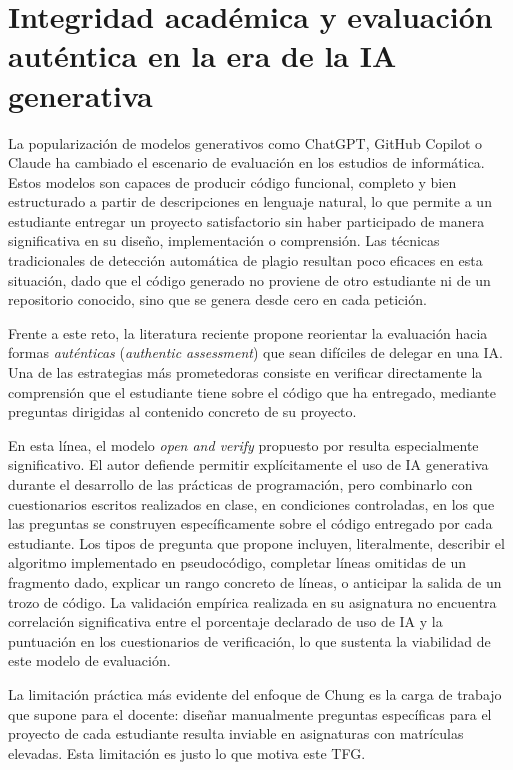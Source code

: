 \section{Integridad académica y evaluación auténtica en la era de la IA generativa}
\label{sec:integridad-academica}

La popularización de modelos generativos como ChatGPT, GitHub Copilot o
Claude ha cambiado el escenario de evaluación en los
estudios de informática. Estos modelos son capaces de producir código
funcional, completo y bien estructurado a partir de descripciones en
lenguaje natural, lo que permite a un estudiante entregar un proyecto
satisfactorio sin haber participado de manera significativa en su
diseño, implementación o comprensión. Las técnicas tradicionales de
detección automática de plagio resultan poco eficaces en esta situación, dado que el código generado no proviene de otro estudiante
ni de un repositorio conocido, sino que se genera desde cero en
cada petición.

Frente a este reto, la literatura reciente propone reorientar la
evaluación hacia formas \emph{auténticas} (\emph{authentic assessment})
que sean difíciles de delegar en una IA. Una de las estrategias más
prometedoras consiste en verificar directamente la comprensión que el
estudiante tiene sobre el código que ha entregado, mediante preguntas
dirigidas al contenido concreto de su proyecto.

En esta línea, el modelo \emph{open and verify} propuesto por
\textcite{chung2026openai} resulta especialmente significativo. El autor
defiende permitir explícitamente el uso de IA generativa durante el
desarrollo de las prácticas de programación, pero combinarlo con
cuestionarios escritos realizados en clase, en condiciones controladas,
en los que las preguntas se construyen específicamente sobre el código
entregado por cada estudiante. Los tipos de pregunta que propone
incluyen, literalmente, describir el algoritmo implementado en
pseudocódigo, completar líneas omitidas de un fragmento dado, explicar
un rango concreto de líneas, o anticipar la salida de un trozo de
código. La validación empírica realizada en su asignatura no encuentra
correlación significativa entre el porcentaje declarado de uso de IA y
la puntuación en los cuestionarios de verificación, lo que sustenta la
viabilidad de este modelo de evaluación.

La limitación práctica más evidente del enfoque de Chung es la carga de
trabajo que supone para el docente: diseñar manualmente preguntas
específicas para el proyecto de cada estudiante resulta inviable en
asignaturas con matrículas elevadas. Esta limitación es justo lo que motiva este TFG.


